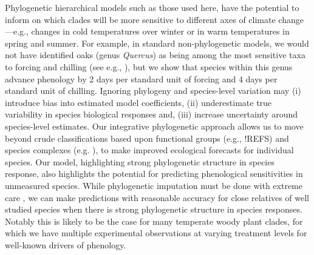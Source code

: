 \documentclass{article}\usepackage[]{graphicx}\usepackage[]{color}
\begin{document}
Phylogenetic hierarchical models such as those used here, have the potential to inform on which clades will be more sensitive to different axes of climate change---e.g., changes in cold temperatures over winter or in warm temperatures in spring and summer. For example, in standard non-phylogenetic models, we would not have identified oaks (genus \emph{Quercus}) as being among the most sensitive taxa to forcing and chilling (see e.g., \citep{ettinger2020}), but we show that species within this genus advance phenology by 2 days per standard unit of forcing and 4 days per standard unit of chilling. Ignoring phylogeny and species-level variation may (i) introduce bias into estimated model coefficients, (ii) underestimate true variability in species biological responses and, (iii) increase uncertainty around species-level estimates. Our integrative phylogenetic approach allows us to move beyond crude classifications based upon functional groups (e.g., !REFS) and species complexes (e.g. \cite{ettinger2020}), to make improved ecological forecasts for individual species. Our model, highlighting strong phylogenetic structure in species response, also highlights the potential for predicting phenological sensitivities in unmeasured species. While phylogenetic imputation must be done with extreme care \citep{molina2018assessing}, we can make predictions with reasonable accuracy for close relatives of well studied species when there is strong phylogenetic structure in species responses. Notably this is likely to be the case for many temperate woody plant clades, for which we have multiple experimental observations at varying treatment levels for well-known drivers of phenology.
\end{document}
